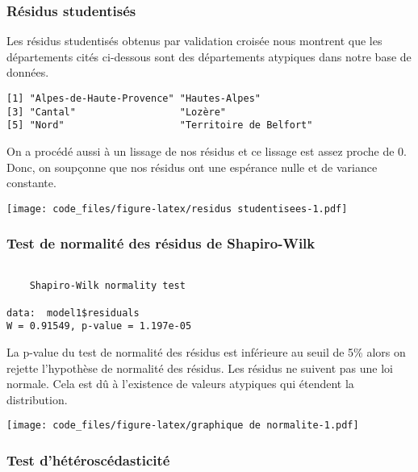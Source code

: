 \documentclass[
]{article}
\begin{document}
\hypertarget{ruxe9sidus-studentisuxe9s}{%
\subsubsection{Résidus studentisés}\label{ruxe9sidus-studentisuxe9s}}

Les résidus studentisés obtenus par validation croisée nous montrent que
les départements cités ci-dessous sont des départements atypiques dans
notre base de données.

\begin{verbatim}
[1] "Alpes-de-Haute-Provence" "Hautes-Alpes"           
[3] "Cantal"                  "Lozère"                 
[5] "Nord"                    "Territoire de Belfort"  
\end{verbatim}

On a procédé aussi à un lissage de nos résidus et ce lissage est assez
proche de 0. Donc, on soupçonne que nos résidus ont une espérance nulle
et de variance constante.

\texttt{[image: code\_files/figure-latex/residus studentisees-1.pdf]}

\hypertarget{test-de-normalituxe9-des-ruxe9sidus-de-shapiro-wilk}{%
\subsubsection{Test de normalité des résidus de
Shapiro-Wilk}\label{test-de-normalituxe9-des-ruxe9sidus-de-shapiro-wilk}}

\begin{verbatim}

    Shapiro-Wilk normality test

data:  model1$residuals
W = 0.91549, p-value = 1.197e-05
\end{verbatim}

La p-value du test de normalité des résidus est inférieure au seuil de
5\% alors on rejette l'hypothèse de normalité des résidus. Les résidus
ne suivent pas une loi normale. Cela est dû à l'existence de valeurs
atypiques qui étendent la distribution.

\texttt{[image: code\_files/figure-latex/graphique de normalite-1.pdf]}

\hypertarget{test-dhuxe9tuxe9roscuxe9dasticituxe9}{%
\subsubsection{Test
d'hétéroscédasticité}\label{test-dhuxe9tuxe9roscuxe9dasticituxe9}}
\end{document}
